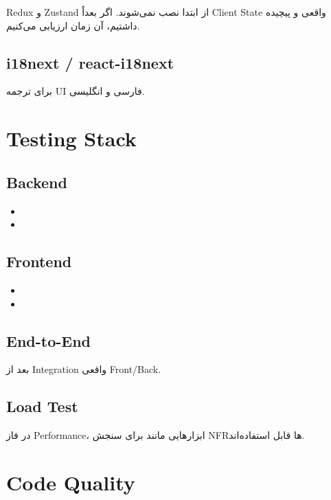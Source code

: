 \begin{decisionbox}
Redux و Zustand از ابتدا نصب نمی‌شوند. اگر بعداً Client State واقعی و پیچیده داشتیم، آن زمان ارزیابی می‌کنیم.
\end{decisionbox}

\subsection{i18next / react-i18next}

برای ترجمه UI فارسی و انگلیسی.

\section{Testing Stack}

\subsection{Backend}

\begin{itemize}
  \item {}
  \item {}
\end{itemize}

\subsection{Frontend}

\begin{itemize}
  \item {}
  \item {}
\end{itemize}

\subsection{End-to-End}

 بعد از Integration واقعی Front/Back.

\subsection{Load Test}

در فاز Performance، ابزارهایی مانند  برای سنجش NFRها قابل استفاده‌اند.

\section{Code Quality}

